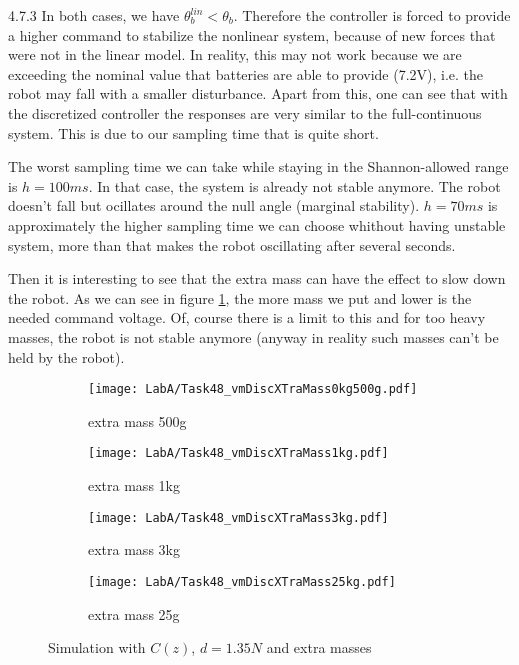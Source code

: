 \documentclass[11pt]{article}
\begin{document}
4.7.3 In both cases, we have $\theta_b^{lin} < \theta_b$. Therefore the controller is forced to provide a higher command to stabilize the nonlinear system, because of new forces that were not in the linear model. In reality, this may not work because we are exceeding the nominal value that batteries are able to provide (7.2V), i.e. the robot may fall with a smaller disturbance. Apart from this, one can see that with the discretized controller the responses are very similar to the full-continuous system. This is due to our sampling time that is quite short.

The worst sampling time we can take while staying in the Shannon-allowed range is $h=100 ms$. In that case, the system is already not stable anymore. The robot doesn't fall but ocillates around the null angle (marginal stability).  $h=70 ms$ is approximately the higher sampling time we can choose whithout having unstable system, more than that makes the robot oscillating after several seconds.

Then it is interesting to see that the extra mass can have the effect to slow down the robot. As we can see in figure \ref{fig:fig7}, the more mass we put and lower is the needed command voltage. Of, course there is a limit to this and for too heavy masses, the robot is not stable anymore (anyway in reality such masses can't be held by the robot).

\begin{figure}[H]
\begin{subfigure}[b]{0.5\linewidth}
  \texttt{[image: LabA/Task48\_vmDiscXTraMass0kg500g.pdf]}
  \caption{extra mass 500g}
\end{subfigure}
\begin{subfigure}[b]{0.5\linewidth}
  \texttt{[image: LabA/Task48\_vmDiscXTraMass1kg.pdf]}
    \caption{extra mass 1kg}
\end{subfigure}
\begin{subfigure}[b]{0.5\linewidth}
  \texttt{[image: LabA/Task48\_vmDiscXTraMass3kg.pdf]}
    \caption{extra mass 3kg}
\end{subfigure}
\begin{subfigure}[b]{0.5\linewidth}
  \texttt{[image: LabA/Task48\_vmDiscXTraMass25kg.pdf]}
    \caption{extra mass 25g}
\end{subfigure}
  \caption{Simulation with $C(z)$, $d=1.35N$ and extra masses}
  \label{fig:fig7}
\end{figure}
\end{document}
